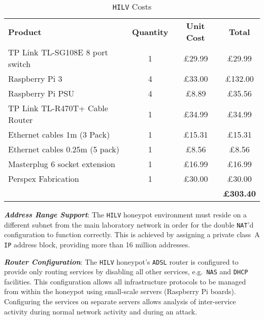 \documentclass{ieeeaccess}
\begin{document}
\begin{table}[ht]
  \caption{\texttt{HILV} Costs\label{table:HILVCosts}}
  \begin{center}
  \setlength\doublerulesep{0.5pt}  
  \begin{tabular}{| l || c | c | c |}
  \hline
  \textbf{Product} & \textbf{Quantity} & \textbf{Unit Cost} & \textbf{Total} \\
  \hhline{|=||=|=|=|}
  \scriptsize{TP Link TL-SG108E 8 port switch} & \scriptsize{1} & \scriptsize{\pounds29.99} & \scriptsize{\pounds29.99} \\
  \hline
  \scriptsize{Raspberry Pi 3} & \scriptsize{4} & \scriptsize{\pounds33.00} & \scriptsize{\pounds132.00} \\
  \hline
  \scriptsize{Raspberry Pi PSU} & \scriptsize{4} & \scriptsize{\pounds8.89} & \scriptsize{\pounds35.56} \\
  \hline
  \scriptsize{TP Link TL-R470T+ Cable Router} & \scriptsize{1} & \scriptsize{\pounds34.99} & \scriptsize{\pounds34.99} \\
  \hline
  \scriptsize{Ethernet cables 1m (3 Pack)} & \scriptsize{1} & \scriptsize{\pounds15.31} & \scriptsize{\pounds15.31} \\
  \hline
  \scriptsize{Ethernet cables 0.25m (5 pack)} & \scriptsize{1} & \scriptsize{\pounds8.56} & \scriptsize{\pounds8.56} \\
  \hline
  \scriptsize{Masterplug 6 socket extension} & \scriptsize{1} & \scriptsize{\pounds16.99} & \scriptsize{\pounds16.99} \\
  \hline
  \scriptsize{Perspex Fabrication} & \scriptsize{1} & \scriptsize{\pounds30.00} & \scriptsize{\pounds30.00} \\
  \hhline{|=||=|=|=|}
   &  &  & \textbf{\pounds303.40} \\
  \hline
  \end{tabular}
  \end{center}
  \end{table}

\noindent\textit{\textbf{Address Range Support}}:
The \texttt{HILV} honeypot environment must reside on a different subnet from
the main laboratory network in order for the double \texttt{NAT}'d
configuration to function correctly. This is achieved by assigning a private
class~A \texttt{IP} address block, providing more than 16 million addresses.
\newline

\noindent\textit{\textbf{Router Configuration}}:
The \texttt{HILV} honeypot's \texttt{ADSL} router is configured to provide only
routing services by disabling all other services, e.g.\ \texttt{NAS} and
\texttt{DHCP} facilities. This configuration allows all infrastructure
protocols to be managed from within the honeypot using small-scale servers
(Raspberry Pi boards). Configuring the services on separate
servers allows analysis of inter-service activity during normal network
activity and during an attack.
\end{document}
